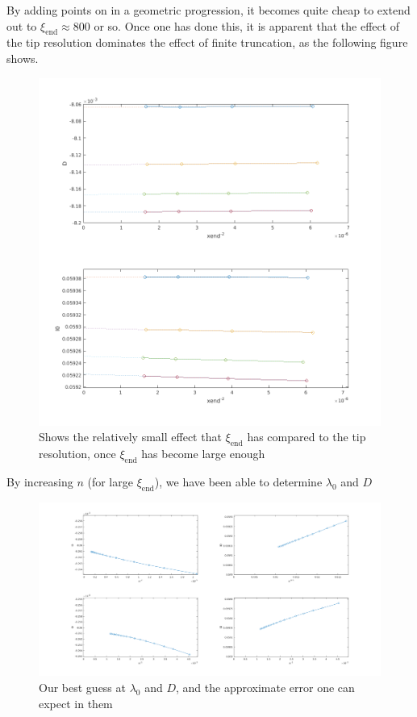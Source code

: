 \documentclass{jfm}
\begin{document}
By adding points on in a geometric progression, it becomes quite cheap to
extend out to $\xi_{\mbox{end}} \approx 800$ or so. Once one has done this,
it is apparent that the effect of the tip resolution dominates the effect
of finite truncation, as the following figure shows.
\begin{figure}
  \centerline{\includegraphics[scale=0.3]{./../../Graphs/xend-effect-l0-D.png}}
  \caption{Shows the relatively small effect that $\xi_{\mathrm{end}}$ has
compared to the tip resolution, once $\xi_{\mathrm{end}}$ has become large
enough}
\end{figure}

By increasing $n$ (for large $\xi_{\mathrm{end}}$), we have been able to 
determine $\lambda_0$ and $D$
\begin{figure}
  \centerline{\includegraphics[scale=0.3]{./../../Graphs/l0-D.png}}
  \caption{Our best guess at $\lambda_0$ and $D$, and the approximate error
one can expect in them}
\end{figure}
\end{document}
